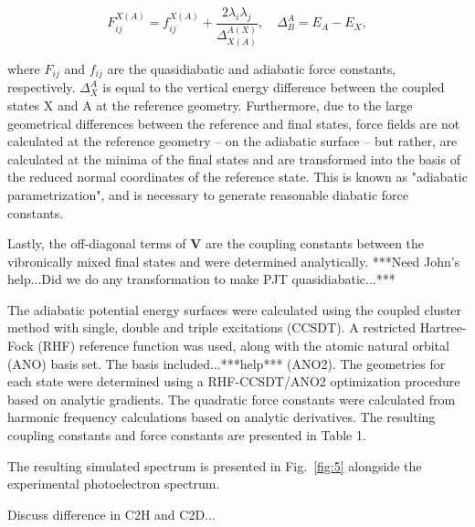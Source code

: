 \documentclass[journal=jpcafh,manuscript=article,layout=onecolumn, 12pt]{achemso}
\begin{document}
\begin{equation*}
F^{X(A)}_{ij} = f_{ij}^{X(A)} + \frac{2\lambda_{i}\lambda_{j}}{\Delta^{A(X)}_{X(A)}}, \quad \Delta^{A}_{B} = E_A - E_X,
\end{equation*}

where $F_{ij}$ and $f_{ij}$ are the quasidiabatic and adiabatic force constants, respectively. $\Delta^{A}_{X}$ is equal to the vertical energy difference between the coupled states X and A at the reference geometry. 
Furthermore, due to the large geometrical differences between the reference and final states, force fields are not calculated at the reference geometry -- on the adiabatic surface -- but rather, are calculated at the minima of the final states and are transformed into the basis of the reduced normal coordinates of the reference state. This is known as "adiabatic parametrization", and is necessary to generate reasonable diabatic force constants.

Lastly, the off-diagonal terms of $\boldsymbol{V}$ are the coupling constants between the vibronically mixed final states and were determined analytically. ***Need John's help...Did we do any transformation to make PJT quasidiabatic...***

The adiabatic potential energy surfaces were calculated using the coupled cluster
method with single, double and triple excitations (CCSDT). A restricted Hartree-Fock (RHF) reference function was used, along with the atomic natural orbital (ANO) basis set. The basis included...***help*** (ANO2). The geometries for each state were determined using a RHF-CCSDT/ANO2 optimization procedure based on analytic gradients. The quadratic force constants were calculated from harmonic frequency calculations based on analytic derivatives. The resulting coupling constants and force constants are presented in Table 1.

The resulting simulated spectrum is presented in Fig.~\ref{fig:5} alongside the experimental photoelectron spectrum. 

Discuss difference in C2H and C2D...
\end{document}
